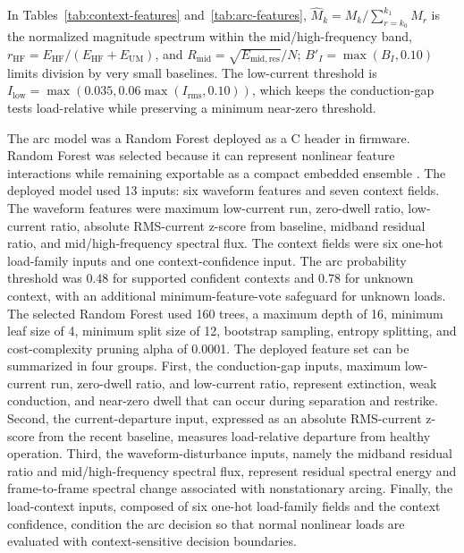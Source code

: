 \documentclass[conference,a4paper]{template/IEEEtran}
\begin{document}
In Tables~\ref{tab:context-features} and~\ref{tab:arc-features},
$\hat{M}_k=M_k/\sum_{r=k_0}^{k_1}M_r$ is the normalized magnitude spectrum
within the mid/high-frequency band, $r_{\mathrm{HF}}=E_{\mathrm{HF}}/
(E_{\mathrm{HF}}+E_{\mathrm{UM}})$, and
$R_{\mathrm{mid}}=\sqrt{E_{\mathrm{mid,res}}}/N$; $B'_I=\max(B_I,0.10)$
limits division by very small baselines. The low-current threshold is
$I_{\mathrm{low}}=\max(0.035,0.06\max(I_{\mathrm{rms}},0.10))$, which keeps
the conduction-gap tests load-relative while preserving a minimum near-zero
threshold.

The arc model was a Random Forest deployed as a C header in firmware.
Random Forest was selected because it can represent nonlinear feature
interactions while remaining exportable as a compact embedded ensemble
\cite{breiman-rf,pedregosa}. The deployed model used 13 inputs: six
waveform features and seven context fields. The waveform features were
maximum low-current run, zero-dwell ratio, low-current ratio, absolute
RMS-current z-score from baseline, midband residual ratio, and
mid/high-frequency spectral flux. The context fields were six one-hot
load-family inputs and one context-confidence input. The arc probability
threshold was 0.48 for supported confident contexts and 0.78 for unknown
context, with an additional minimum-feature-vote safeguard for unknown
loads. The selected Random Forest used 160 trees, a maximum depth of 16,
minimum leaf size of 4, minimum split size of 12, bootstrap sampling,
entropy splitting, and cost-complexity pruning alpha of 0.0001. The
deployed feature set can be summarized in four groups. First,
the conduction-gap inputs, maximum low-current run, zero-dwell ratio,
and low-current ratio, represent extinction, weak conduction, and
near-zero dwell that can occur during separation and restrike. Second,
the current-departure input, expressed as an absolute RMS-current
z-score from the recent baseline, measures load-relative departure from
healthy operation. Third, the waveform-disturbance inputs, namely the
midband residual ratio and mid/high-frequency spectral flux, represent
residual spectral energy and frame-to-frame spectral change associated
with nonstationary arcing. Finally, the load-context inputs, composed of
six one-hot load-family fields and the context confidence, condition the
arc decision so that normal nonlinear loads are evaluated with
context-sensitive decision boundaries.
\end{document}
